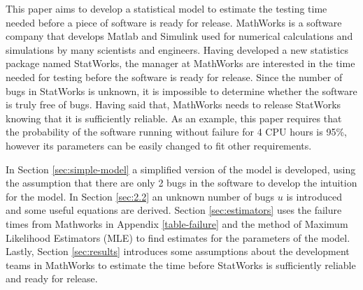 This paper aims to develop a statistical model to estimate the testing time needed before a piece of software is ready for release. MathWorks is a software company that develops Matlab and Simulink used for numerical calculations and simulations by many scientists and engineers. Having developed a new statistics package named StatWorks, the manager at MathWorks are interested in the time needed for testing before the software is ready for release. Since the number of bugs in StatWorks is unknown, it is impossible to determine whether the software is truly free of bugs. Having said that, MathWorks needs to release StatWorks knowing that it is sufficiently reliable. As an example, this paper requires that the probability of the software running without failure for 4 CPU hours is 95\%, however its parameters can be easily changed to fit other requirements.

In Section \ref{sec:simple-model} a simplified version of the model is developed, using the assumption that there are only 2 bugs in the software to develop the intuition for the model. In Section \ref{sec:2.2} an unknown number of bugs $u$ is introduced and some useful equations are derived. Section \ref{sec:estimators} uses the failure times from Mathworks in Appendix \ref{table-failure} and the method of Maximum Likelihood Estimators (MLE) to find estimates for the parameters of the model. Lastly, Section \ref{sec:results} introduces some assumptions about the development teams in MathWorks to estimate the time before StatWorks is sufficiently reliable and ready for release.